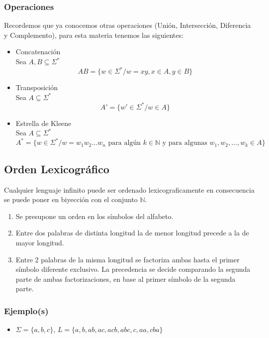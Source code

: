 \subsubsection{Operaciones}
Recordemos que ya conocemos otras operaciones (Unión, Intersección, Diferencia y Complemento), para esta materia tenemos las siguientes:
\begin{itemize}
\item Concatenación \\ ${ }$ \\
Sea $A,B \subseteq \Sigma^*$ \\
$$AB =\{ w\in\Sigma^* / w=xy, x\in A, y\in B \}$$
\item Transposición \\ ${ }$ \\
Sea $A\subseteq \Sigma^*$ \\
$$A'=\{ w'\in \Sigma^* /w\in A\} $$
\item Estrella de Kleene \\ ${ }$ \\
Sea $A\subseteq \Sigma^*$ \\
$$A^* = \{w\in\Sigma^* / w=w_1 w_2 \ldots w_n \text{ para algún } k\in\mathbb{N} \text{ y para algunas }w_1,w_2,\ldots,w_k \in A\}$$
\end{itemize}
\subsection{Orden Lexicográfico}
Cualquier lenguaje infinito puede ser ordenado lexicograficamente en consecuencia se puede poner en biyección con el conjunto $\mathbb{N}$.
\begin{enumerate}
\item Se presupone un orden en los símbolos del alfabeto.
\item Entre dos palabras de distinta longitud la de menor longitud precede a la de mayor longitud.
\item Entre 2 palabras de la misma longitud se factoriza ambas hasta el primer símbolo diferente exclusivo. La precedencia se decide comparando la segunda parte de ambas factorizaciones, en base al primer símbolo de la segunda parte.
\end{enumerate}

\subsubsection*{Ejemplo(s)}

\begin{itemize}
\item $\Sigma = \{ a,b,c \}$, $L=\{ a,b,ab,ac,acb,abc,c,aa,cba \}$
\end{itemize}

